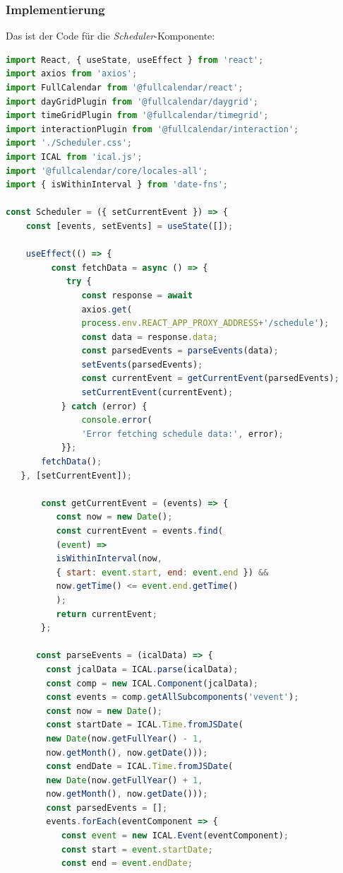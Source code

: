 \subsubsection{Implementierung}
Das ist der Code für die \emph{Scheduler}-Komponente:
\begin{lstlisting}[language=JavaScript,
	frame=single,           % Ein Rahmen um den Code
	framexleftmargin=15pt,  % Rahmen link von den Zahlen
	style=algoBericht,
	label={Scheduler-Komponente},
	captionpos=b ,          % Caption unter den Code setzen
	caption={Scheduler-Komponente}]
import React, { useState, useEffect } from 'react';
import axios from 'axios';
import FullCalendar from '@fullcalendar/react';
import dayGridPlugin from '@fullcalendar/daygrid';
import timeGridPlugin from '@fullcalendar/timegrid';
import interactionPlugin from '@fullcalendar/interaction';
import './Scheduler.css';
import ICAL from 'ical.js';
import '@fullcalendar/core/locales-all';
import { isWithinInterval } from 'date-fns';

const Scheduler = ({ setCurrentEvent }) => {
    const [events, setEvents] = useState([]);
    
    useEffect(() => {
         const fetchData = async () => {
            try {
               const response = await 
               axios.get(
               process.env.REACT_APP_PROXY_ADDRESS+'/schedule');
               const data = response.data;
               const parsedEvents = parseEvents(data);
               setEvents(parsedEvents);
               const currentEvent = getCurrentEvent(parsedEvents);
               setCurrentEvent(currentEvent);
           } catch (error) {
               console.error(
               'Error fetching schedule data:', error);
           }};
       fetchData();
   }, [setCurrentEvent]);

       const getCurrentEvent = (events) => {
       	  const now = new Date();
       	  const currentEvent = events.find(
       	  (event) =>
       	  isWithinInterval(now, 
       	  { start: event.start, end: event.end }) &&
       	  now.getTime() <= event.end.getTime()
       	  );
       	  return currentEvent;
       };
      
      const parseEvents = (icalData) => {
        const jcalData = ICAL.parse(icalData);
        const comp = new ICAL.Component(jcalData);
        const events = comp.getAllSubcomponents('vevent');
        const now = new Date();
        const startDate = ICAL.Time.fromJSDate(
        new Date(now.getFullYear() - 1, 
        now.getMonth(), now.getDate()));
        const endDate = ICAL.Time.fromJSDate(
        new Date(now.getFullYear() + 1, 
        now.getMonth(), now.getDate()));
        const parsedEvents = [];
        events.forEach(eventComponent => {
           const event = new ICAL.Event(eventComponent);
           const start = event.startDate;
           const end = event.endDate;
           

\end{lstlisting}
